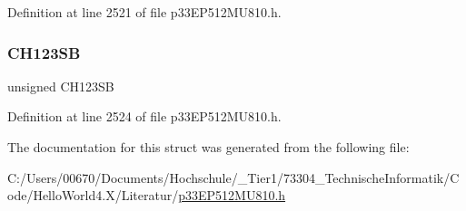 Definition at line 2521 of file p33\+E\+P512\+M\+U810.\+h.

\mbox{\label{structtag_a_d1_c_h_s123_b_i_t_s_a43fe4bf282da0b96630808288b9dfdd6}} 
\subsubsection{\texorpdfstring{C\+H123\+SB}{CH123SB}}
{\footnotesize\ttfamily unsigned C\+H123\+SB}



Definition at line 2524 of file p33\+E\+P512\+M\+U810.\+h.



The documentation for this struct was generated from the following file\+:\begin{DoxyCompactItemize}
\item 
C\+:/\+Users/00670/\+Documents/\+Hochschule/\+\_\+\+Tier1/73304\+\_\+\+Technische\+Informatik/\+Code/\+Hello\+World4.\+X/\+Literatur/\hyperlink{p33_e_p512_m_u810_8h}{p33\+E\+P512\+M\+U810.\+h}\end{DoxyCompactItemize}
